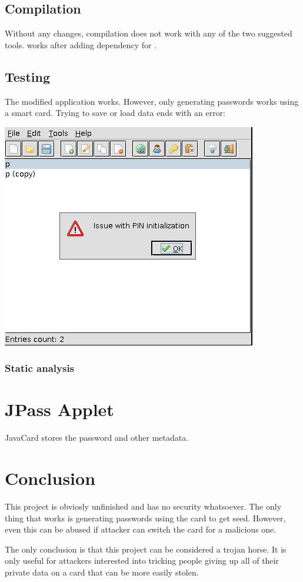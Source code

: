 \documentclass[paper=a4, fontsize=12pt]{scrartcl}
\begin{document}
\subsection{Compilation}
Without any changes, compilation does not work with any of the two suggested tools.
\verb@Maven@ works after adding dependency for \verb@jcardsim@.

\subsection{Testing}
The modified application works.
However, only generating passwords works using a smart card.
Trying to save or load data ends with an error:

\includegraphics[scale=0.5]{jpass_error}

\subsubsection{Static analysis}


\section{JPass Applet}
JavaCard stores the password and other metadata.

\section{Conclusion}
This project is obviosly unfinished and has no security whatsoever.
The only thing that works is generating passwords using the card to get seed.
However, even this can be abused if attacker can switch the card for a malicious one.

The only conclusion is that this project can be considered a trojan horse.
It is only useful for attackers interested into tricking people giving up all of their private data on a card that can be more easily stolen.
\end{document}
